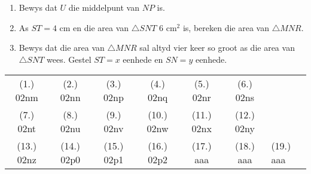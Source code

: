 \begin{eocexercises}{}
\begin{enumerate}[itemsep=20pt, label=\textbf{\arabic*}.]
\begin{center}
{}
\end{center}
\begin{enumerate}[noitemsep, label=\textbf{(\alph*)} ]
\item Bewys dat $U$ die middelpunt van $NP$ is.
\item As $ST=4$ cm en die area van $\triangle SNT$ $6$ cm$^2$ is, bereken die area van $\triangle MNR$.
\item Bewys dat die area van $\triangle MNR$ sal altyd vier keer so groot as die area van $\triangle SNT$ wees. Gestel $ST=x$ eenhede en $SN=y$ eenhede.
\end{enumerate}
\end{enumerate}

\par \practiceinfo
\par \begin{tabular}[h]{cccccc}
(1.)	02nm	&
(2.)	02nn	&
(3.)	02np	&
(4.)	02nq	&
(5.)	02nr	&
(6.)	02ns	\\ %
(7.)	02nt	&
(8.)	02nu	&
(9.)	02nv	&
(10.)	02nw	&
(11.)	02nx	&
(12.)	02ny	\\ %
(13.)	02nz	&
(14.)	02p0	&
(15.)	02p1	&
(16.)	02p2	&

(17.)	aaa	&
(18.)	aaa	&
(19.)	aaa	&
\end{tabular}
\end{eocexercises}
